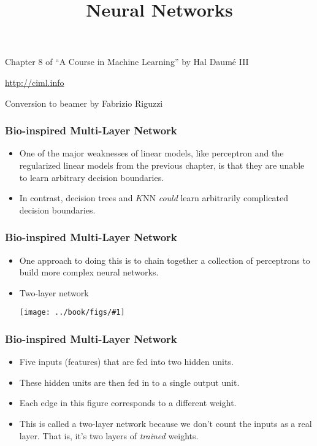 \documentclass[trans]{beamer}
\title[Neural Networks]
{Neural Networks}
\institute[] %
{
}
\date{}
\newcommand{\myalert}[1]{{%
 #1}}
\begin{document}
\begin{frame}
\titlepage 
\vspace{-2cm}
\begin{center}
Chapter 8 of ``A Course in  Machine Learning'' by Hal Daum\'e III

\url{http://ciml.info}

Conversion to beamer by Fabrizio Riguzzi
\end{center}


\end{frame}
  \renewcommand{\concept}[1]{\myalert{#1}}
  \renewcommand{\koncept}[2]{\myalert{#1}}

\renewcommand{\Figure}[3]{%
    \begin{center}
    \texttt{[image: ../book/figs/\#1]}
    \end{center}
  }
  
\begin{frame}
  \frametitle{Bio-inspired Multi-Layer Network}
\begin{itemize}
\item 
One of the major weaknesses of linear models, like perceptron and the
regularized linear models from the previous chapter, is that they are unable to learn arbitrary decision
boundaries.
\item  In contrast, decision trees and $K$NN \emph{could} learn
arbitrarily complicated decision boundaries.
\end{itemize}
\end{frame}

\begin{frame}
  \frametitle{Bio-inspired Multi-Layer Network}
\begin{itemize}
\item 
One approach to doing this is to chain together a collection of
perceptrons to build more complex \concept{neural networks}. 
\item \concept{Two-layer network} 
\Figure{nnet:twolayer}{picture of a two-layer network with 5
  inputs and two hidden units}{0.4}
\end{itemize}
\end{frame}

\begin{frame}
  \frametitle{Bio-inspired Multi-Layer Network}
\begin{itemize}
\item Five inputs
(features) that are fed into two \concept{hidden units}.
\item  These hidden
units are then fed in to a single \concept{output unit}. 
\item
 Each edge in
this figure corresponds to a different weight.  
\item This is called a two-layer network
because we don't count the inputs as a real layer.  That is, it's two
layers of \emph{trained} weights.
\end{itemize}
\end{frame}
\end{document}
